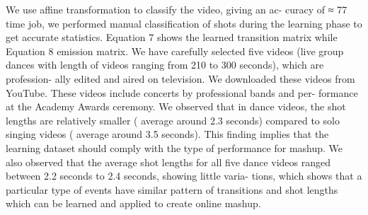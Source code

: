 \documentclass{sig-alternate}
\begin{document}
We use affine transformation to classify the video, giving an ac-
curacy of ≈ 77%
time job, we performed manual classification of shots during the
learning phase to get accurate statistics. Equation 7 shows the
learned transition matrix while Equation 8 emission matrix. We
have carefully selected five videos (live group dances with length
of videos ranging from 210 to 300 seconds), which are profession-
ally edited and aired on television. We downloaded these videos
from YouTube.
These videos include concerts by professional bands and per-
formance at the Academy Awards ceremony. We observed that
in dance videos, the shot lengths are relatively smaller ( average
around 2.3 seconds) compared to solo singing videos ( average
around 3.5 seconds). This finding implies that the learning dataset
should comply with the type of performance for mashup. We also
observed that the average shot lengths for all five dance videos
ranged between 2.2 seconds to 2.4 seconds, showing little varia-
tions, which shows that a particular type of events have similar
pattern of transitions and shot lengths which can be learned and
applied to create online mashup.
\end{document}
